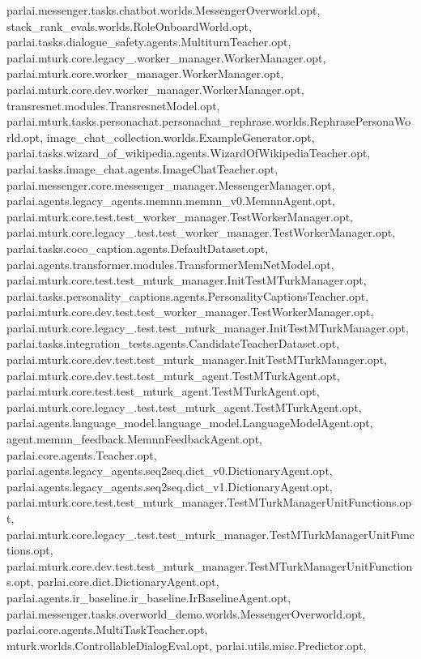 parlai.\+messenger.\+tasks.\+chatbot.\+worlds.\+Messenger\+Overworld.\+opt, stack\+\_\+rank\+\_\+evals.\+worlds.\+Role\+Onboard\+World.\+opt, parlai.\+tasks.\+dialogue\+\_\+safety.\+agents.\+Multiturn\+Teacher.\+opt, parlai.\+mturk.\+core.\+legacy\+\_.\+worker\+\_\+manager.\+Worker\+Manager.\+opt, parlai.\+mturk.\+core.\+worker\+\_\+manager.\+Worker\+Manager.\+opt, parlai.\+mturk.\+core.\+dev.\+worker\+\_\+manager.\+Worker\+Manager.\+opt, transresnet.\+modules.\+Transresnet\+Model.\+opt, parlai.\+mturk.\+tasks.\+personachat.\+personachat\+\_\+rephrase.\+worlds.\+Rephrase\+Persona\+World.\+opt, image\+\_\+chat\+\_\+collection.\+worlds.\+Example\+Generator.\+opt, parlai.\+tasks.\+wizard\+\_\+of\+\_\+wikipedia.\+agents.\+Wizard\+Of\+Wikipedia\+Teacher.\+opt, parlai.\+tasks.\+image\+\_\+chat.\+agents.\+Image\+Chat\+Teacher.\+opt, parlai.\+messenger.\+core.\+messenger\+\_\+manager.\+Messenger\+Manager.\+opt, parlai.\+agents.\+legacy\+\_\+agents.\+memnn.\+memnn\+\_\+v0.\+Memnn\+Agent.\+opt, parlai.\+mturk.\+core.\+test.\+test\+\_\+worker\+\_\+manager.\+Test\+Worker\+Manager.\+opt, parlai.\+mturk.\+core.\+legacy\+\_.\+test.\+test\+\_\+worker\+\_\+manager.\+Test\+Worker\+Manager.\+opt, parlai.\+tasks.\+coco\+\_\+caption.\+agents.\+Default\+Dataset.\+opt, parlai.\+agents.\+transformer.\+modules.\+Transformer\+Mem\+Net\+Model.\+opt, parlai.\+mturk.\+core.\+test.\+test\+\_\+mturk\+\_\+manager.\+Init\+Test\+M\+Turk\+Manager.\+opt, parlai.\+tasks.\+personality\+\_\+captions.\+agents.\+Personality\+Captions\+Teacher.\+opt, parlai.\+mturk.\+core.\+dev.\+test.\+test\+\_\+worker\+\_\+manager.\+Test\+Worker\+Manager.\+opt, parlai.\+mturk.\+core.\+legacy\+\_.\+test.\+test\+\_\+mturk\+\_\+manager.\+Init\+Test\+M\+Turk\+Manager.\+opt, parlai.\+tasks.\+integration\+\_\+tests.\+agents.\+Candidate\+Teacher\+Dataset.\+opt, parlai.\+mturk.\+core.\+dev.\+test.\+test\+\_\+mturk\+\_\+manager.\+Init\+Test\+M\+Turk\+Manager.\+opt, parlai.\+mturk.\+core.\+dev.\+test.\+test\+\_\+mturk\+\_\+agent.\+Test\+M\+Turk\+Agent.\+opt, parlai.\+mturk.\+core.\+test.\+test\+\_\+mturk\+\_\+agent.\+Test\+M\+Turk\+Agent.\+opt, parlai.\+mturk.\+core.\+legacy\+\_.\+test.\+test\+\_\+mturk\+\_\+agent.\+Test\+M\+Turk\+Agent.\+opt, parlai.\+agents.\+language\+\_\+model.\+language\+\_\+model.\+Language\+Model\+Agent.\+opt, agent.\+memnn\+\_\+feedback.\+Memnn\+Feedback\+Agent.\+opt, parlai.\+core.\+agents.\+Teacher.\+opt, parlai.\+agents.\+legacy\+\_\+agents.\+seq2seq.\+dict\+\_\+v0.\+Dictionary\+Agent.\+opt, parlai.\+agents.\+legacy\+\_\+agents.\+seq2seq.\+dict\+\_\+v1.\+Dictionary\+Agent.\+opt, parlai.\+mturk.\+core.\+test.\+test\+\_\+mturk\+\_\+manager.\+Test\+M\+Turk\+Manager\+Unit\+Functions.\+opt, parlai.\+mturk.\+core.\+legacy\+\_.\+test.\+test\+\_\+mturk\+\_\+manager.\+Test\+M\+Turk\+Manager\+Unit\+Functions.\+opt, parlai.\+mturk.\+core.\+dev.\+test.\+test\+\_\+mturk\+\_\+manager.\+Test\+M\+Turk\+Manager\+Unit\+Functions.\+opt, parlai.\+core.\+dict.\+Dictionary\+Agent.\+opt, parlai.\+agents.\+ir\+\_\+baseline.\+ir\+\_\+baseline.\+Ir\+Baseline\+Agent.\+opt, parlai.\+messenger.\+tasks.\+overworld\+\_\+demo.\+worlds.\+Messenger\+Overworld.\+opt, parlai.\+core.\+agents.\+Multi\+Task\+Teacher.\+opt, mturk.\+worlds.\+Controllable\+Dialog\+Eval.\+opt, parlai.\+utils.\+misc.\+Predictor.\+opt, 